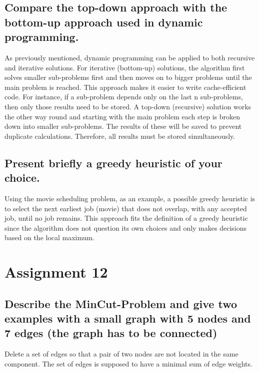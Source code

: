 \documentclass[runningheads]{llncs}
\begin{document}
\subsection*{Compare the top-down approach with the bottom-up approach used in dynamic programming.}
As previously mentioned, dynamic programming can be applied to both recursive and iterative solutions. For iterative (bottom-up) solutions, the algorithm first solves
smaller sub-problems first and then moves on to bigger problems until the main problem is reached. This approach makes it easier to write cache-efficient code. For
instance, if a sub-problem depends only on the last n sub-problems, then only those results need to be stored. A top-down (recursive) solution works the other way round and
starting with the main problem each step is broken down into smaller sub-problems. The results of these will be saved to prevent duplicate calculations. Therefore,
all results must be stored simultaneously.

\subsection*{Present briefly a greedy heuristic of your choice.}
Using the movie scheduling problem, as an example, a possible greedy heuristic is to select the next earliest job (movie) that does not overlap, with any accepted job, until
no job remains. This approach fits the definition of a greedy heuristic since the algorithm does not question its own choices and only makes decisions based on the local maximum.


\section*{Assignment 12}
\subsection*{Describe the MinCut-Problem and give two examples with a small graph with
    5 nodes and 7 edges (the graph has to be connected)}

Delete a set of edges so that a pair of two nodes are not located in the same component. The set of edges is supposed to have a minimal sum of
edge weights.


\begin{thebibliography}{8}

\end{thebibliography}
\end{document}
